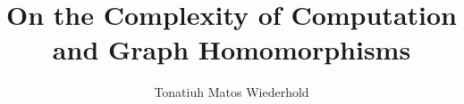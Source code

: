 \documentclass{ut-thesis}
\author{Tonatiuh Matos Wiederhold}
\title{On the Complexity of Computation and Graph Homomorphisms}
\begin{document}
\frontmatter
\maketitle


%


\tableofcontents
\listoffigures

\mainmatter

\linenumbers







\backmatter

\nocite{*}


\end{document}
